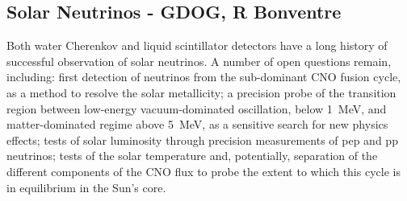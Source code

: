 \subsection{Solar Neutrinos - GDOG, R Bonventre}


Both water Cherenkov and liquid scintillator detectors have a long history of successful observation of solar neutrinos.  A number of open questions remain, including: first detection of neutrinos from the sub-dominant CNO fusion cycle, as a method to resolve the solar metallicity; a precision probe of the transition region between low-energy vacuum-dominated oscillation, below 1~MeV, and matter-dominated regime above 5~MeV, as a sensitive search for new physics effects; tests of solar luminosity through precision measurements of pep and pp neutrinos; tests of the solar temperature and, potentially, separation of the different components of the CNO flux to probe the extent to which this cycle is in equilibrium in the Sun's core.

